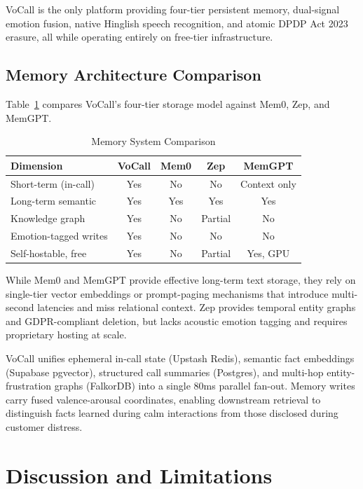 \documentclass[conference]{IEEEtran}
\begin{document}
VoCall is the only platform providing four-tier persistent memory, dual-signal emotion fusion, native Hinglish speech recognition, and atomic DPDP Act 2023 erasure, all while operating entirely on free-tier infrastructure.

\subsection{Memory Architecture Comparison}
Table~\ref{tab:memcompare} compares VoCall's four-tier storage model against Mem0, Zep, and MemGPT.

\begin{table}[b]
\centering
\caption{Memory System Comparison}
\label{tab:memcompare}
\footnotesize
\begin{tabularx}{\columnwidth}{@{}X c c c c@{}}
\toprule
\textbf{Dimension} & \textbf{VoCall} & \textbf{Mem0} & \textbf{Zep} & \textbf{MemGPT} \\
\midrule
Short-term (in-call) & Yes & No & No & Context only \\
Long-term semantic & Yes & Yes & Yes & Yes \\
Knowledge graph & Yes & No & Partial & No \\
Emotion-tagged writes & Yes & No & No & No \\
Self-hostable, free & Yes & No & Partial & Yes, GPU \\
\bottomrule
\end{tabularx}
\end{table}


While Mem0 and MemGPT provide effective long-term text storage, they rely on single-tier vector embeddings or prompt-paging mechanisms that introduce multi-second latencies and miss relational context. Zep provides temporal entity graphs and GDPR-compliant deletion, but lacks acoustic emotion tagging and requires proprietary hosting at scale. 

VoCall unifies ephemeral in-call state (Upstash Redis), semantic fact embeddings (Supabase pgvector), structured call summaries (Postgres), and multi-hop entity-frustration graphs (FalkorDB) into a single 80ms parallel fan-out. Memory writes carry fused valence-arousal coordinates, enabling downstream retrieval to distinguish facts learned during calm interactions from those disclosed during customer distress.

\balance
\section{Discussion and Limitations}
\label{sec:discussion}
\end{document}
